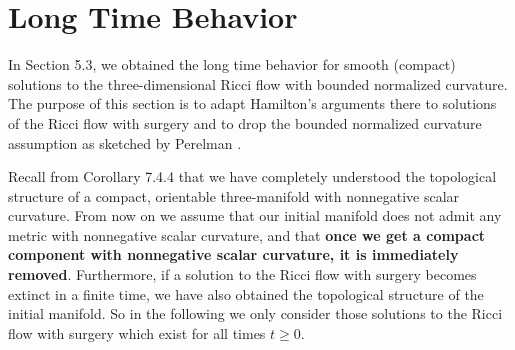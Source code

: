 \section{Long Time Behavior}

In Section 5.3, we obtained the long time behavior for smooth
(compact) solutions to the three-dimensional Ricci flow with
bounded normalized curvature. The purpose of this section is to
adapt Hamilton's arguments there to solutions of the Ricci flow
with surgery and to drop the bounded normalized curvature
assumption as sketched by Perelman \cite{P2}.

Recall from Corollary 7.4.4 that we have completely understood the
topological structure of a compact, orientable three-manifold with
nonnegative scalar curvature. From now on we assume that our
initial manifold does not admit any metric with nonnegative scalar
curvature, and that \textbf{once we get a compact component with
nonnegative scalar curvature, it is immediately removed}.
Furthermore, if a solution to the Ricci flow with surgery becomes
extinct in a finite time, we have also obtained the topological
structure of the initial manifold. So in the following we only
consider those solutions to the Ricci flow with surgery which
exist for all times $t \geq 0$.

